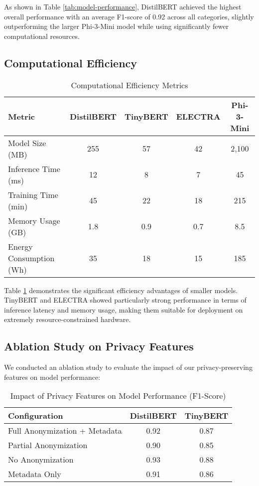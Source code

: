 \documentclass[11pt,a4paper]{article}
\begin{document}
As shown in Table \ref{tab:model-performance}, DistilBERT achieved the highest overall performance with an average F1-score of 0.92 across all categories, slightly outperforming the larger Phi-3-Mini model while using significantly fewer computational resources.

\subsection{Computational Efficiency}

\begin{table}[h!]
\centering
\caption{Computational Efficiency Metrics}
\label{tab:efficiency}
\begin{tabular}{lcccc}
\toprule
\textbf{Metric} & \textbf{DistilBERT} & \textbf{TinyBERT} & \textbf{ELECTRA} & \textbf{Phi-3-Mini} \\
\midrule
Model Size (MB) & 255 & 57 & 42 & 2,100 \\
Inference Time (ms) & 12 & 8 & 7 & 45 \\
Training Time (min) & 45 & 22 & 18 & 215 \\
Memory Usage (GB) & 1.8 & 0.9 & 0.7 & 8.5 \\
Energy Consumption (Wh) & 35 & 18 & 15 & 185 \\
\bottomrule
\end{tabular}
\end{table}

Table \ref{tab:efficiency} demonstrates the significant efficiency advantages of smaller models. TinyBERT and ELECTRA showed particularly strong performance in terms of inference latency and memory usage, making them suitable for deployment on extremely resource-constrained hardware.

\subsection{Ablation Study on Privacy Features}
We conducted an ablation study to evaluate the impact of our privacy-preserving features on model performance:

\begin{table}[h!]
\centering
\caption{Impact of Privacy Features on Model Performance (F1-Score)}
\label{tab:ablation}
\begin{tabular}{lcc}
\toprule
\textbf{Configuration} & \textbf{DistilBERT} & \textbf{TinyBERT} \\
\midrule
Full Anonymization + Metadata & 0.92 & 0.87 \\
Partial Anonymization & 0.90 & 0.85 \\
No Anonymization & 0.93 & 0.88 \\
Metadata Only & 0.91 & 0.86 \\
\bottomrule
\end{tabular}
\end{table}
\end{document}

